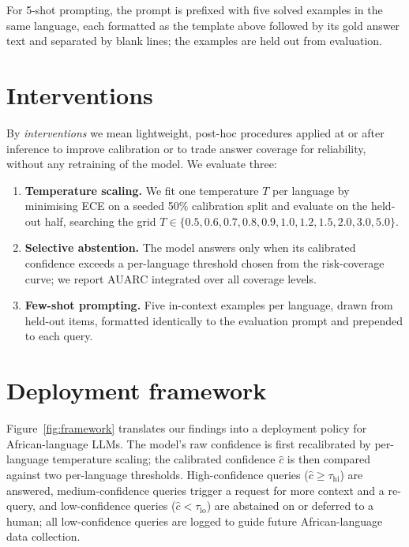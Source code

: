 \documentclass[pmlr]{jmlr}%
\begin{document}
For 5-shot prompting, the prompt is prefixed with five solved examples in the same language, each
formatted as the template above followed by its gold answer text and separated by blank lines; the
examples are held out from evaluation.

\section{Interventions}\label{app:interventions}
By \emph{interventions} we mean lightweight, post-hoc procedures applied at or after inference to
improve calibration or to trade answer coverage for reliability, without any retraining of the model.
We evaluate three:
\begin{enumerate}\itemsep1pt
  \item \textbf{Temperature scaling.} We fit one temperature $T$ per language by minimising ECE on a
  seeded 50\% calibration split and evaluate on the held-out half, searching the grid
  $T \in \{0.5, 0.6, 0.7, 0.8, 0.9, 1.0, 1.2, 1.5, 2.0, 3.0, 5.0\}$.
  \item \textbf{Selective abstention.} The model answers only when its calibrated confidence exceeds
  a per-language threshold chosen from the risk-coverage curve; we report AUARC integrated over all
  coverage levels.
  \item \textbf{Few-shot prompting.} Five in-context examples per language, drawn from held-out items,
  formatted identically to the evaluation prompt and prepended to each query.
\end{enumerate}

\section{Deployment framework}\label{app:framework}
Figure~\ref{fig:framework} translates our findings into a deployment policy for African-language
LLMs. The model's raw confidence is first recalibrated by per-language temperature scaling; the
calibrated confidence $\hat{c}$ is then compared against two per-language thresholds. High-confidence
queries ($\hat{c}\geq\tau_{\mathrm{hi}}$) are answered, medium-confidence queries trigger a request
for more context and a re-query, and low-confidence queries ($\hat{c}<\tau_{\mathrm{lo}}$) are
abstained on or deferred to a human; all low-confidence queries are logged to guide future
African-language data collection.
\end{document}
